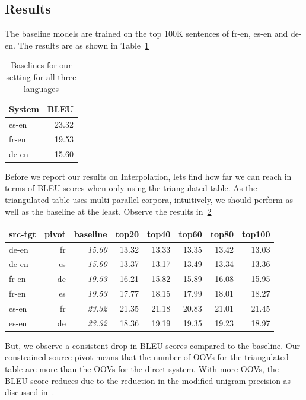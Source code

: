 \subsection{Results}
	The baseline models are trained on the top 100K sentences of fr-en, es-en and de-en. The results are as shown in Table~\ref{table:eparlbaselines}
\begin{table}
	\begin{tabular}{lr}

	\toprule
	System & BLEU \\
	\toprule
	es-en & 23.32 \\
	fr-en & 19.53 \\
	de-en & 15.60 \\
	\bottomrule
	\end{tabular}
	\centering
	\small
	\caption{Baselines for our setting for all three languages}
	\label{table:eparlbaselines}
\end{table}

	Before we report our results on Interpolation, lets find how far we can reach in terms of BLEU scores when only using the triangulated table. As the triangulated table uses multi-parallel corpora, intuitively, we should perform as well as the baseline at the least. Observe the results in~\ref{table:eparltopn}
	\begin{table}
	\begin{tabular}{lrrrrrrr}
		\toprule
		src-tgt & pivot & baseline & top20 & top40 & top60 & top80 & top100 \\
		\toprule
		de-en & fr & \emph{15.60} & 13.32 & 13.33 & 13.35 & 13.42 & 13.03 \\
		de-en & es & \emph{15.60} & 13.37 & 13.17 & 13.49 & 13.34 & 13.36 \\
		fr-en & de & \emph{19.53} & 16.21 & 15.82 & 15.89 & 16.08 & 15.95 \\
		fr-en & es & \emph{19.53} & 17.77 & 18.15 & 17.99 & 18.01 & 18.27 \\
		es-en & fr & \emph{23.32} & 21.35 & 21.18 & 20.83 & 21.01 & 21.45\\
		es-en & de & \emph{23.32} & 18.36 & 19.19 & 19.35 & 19.23 & 18.97 \\
		\bottomrule
		\end{tabular}
		\centering 
		\small
		\label{table:eparltopn}
	\end{table}

	But, we observe a consistent drop in BLEU scores compared to the baseline. Our constrained source pivot means that the number of OOVs for the triangulated table are more than the OOVs for the direct system. With more OOVs, the BLEU score reduces due to the reduction in the modified unigram precision as discussed in~. 

